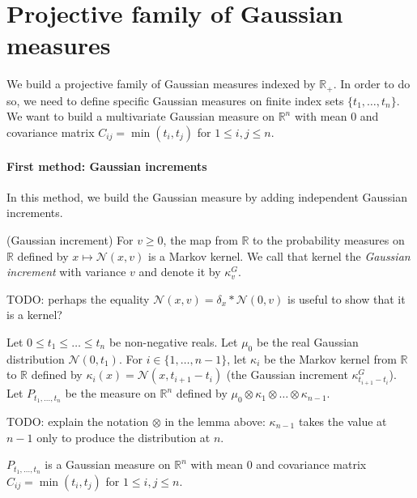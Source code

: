 \section{Projective family of Gaussian measures}

We build a projective family of Gaussian measures indexed by $\mathbb{R}_+$.
In order to do so, we need to define specific Gaussian measures on finite index sets $\{t_1, \ldots, t_n\}$.
We want to build a multivariate Gaussian measure on $\mathbb{R}^n$ with mean $0$ and covariance matrix $C_{ij} = \min(t_i, t_j)$ for $1 \leq i,j \leq n$.

\paragraph{First method: Gaussian increments}

In this method, we build the Gaussian measure by adding independent Gaussian increments.

\begin{definition}(Gaussian increment)\label{def:gaussianIncrement}
For $v \ge 0$, the map from $\mathbb{R}$ to the probability measures on $\mathbb{R}$ defined by $x \mapsto \mathcal{N}(x, v)$ is a Markov kernel.
We call that kernel the \emph{Gaussian increment} with variance $v$ and denote it by $\kappa^G_v$.
\end{definition}

TODO: perhaps the equality $\mathcal{N}(x, v) = \delta_x \ast \mathcal{N}(0, v)$ is useful to show that it is a kernel?

\begin{definition}\label{def:gaussianFromIncrements}
Let $0 \le t_1 \le \ldots \le t_n$ be non-negative reals.
Let $\mu_0$ be the real Gaussian distribution $\mathcal{N}(0, t_1)$.
For $i \in \{1, \ldots, n-1\}$, let $\kappa_i$ be the Markov kernel from $\mathbb{R}$ to $\mathbb{R}$ defined by $\kappa_i(x) = \mathcal{N}(x, t_{i+1} - t_i)$ (the Gaussian increment $\kappa^G_{t_{i+1} - t_i}$).
Let $P_{t_1, \ldots, t_n}$ be the measure on $\mathbb{R}^n$ defined by $\mu_0 \otimes \kappa_1 \otimes \ldots \otimes \kappa_{n-1}$.
\end{definition}

TODO: explain the notation $\otimes$ in the lemma above: $\kappa_{n-1}$ takes the value at $n-1$ only to produce the distribution at $n$.

\begin{lemma}\label{lem:isGaussian_gaussianFromIncrements}
$P_{t_1, \ldots, t_n}$ is a Gaussian measure on $\mathbb{R}^n$ with mean $0$ and covariance matrix $C_{ij} = \min(t_i, t_j)$ for $1 \leq i,j \leq n$.
\end{lemma}


